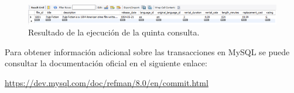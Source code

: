\documentclass{db-practice}
\begin{document}
\begin{figure}[ht]
    \centering
    \includegraphics[width=0.9\columnwidth]{figs/5consulta.png}
    \caption{Resultado de la ejecución de la quinta consulta.}\label{fig:5consulta}
\end{figure}

Para obtener información adicional sobre las transacciones en MySQL se puede consultar la documentación oficial en el siguiente enlace:

\url{https://dev.mysql.com/doc/refman/8.0/en/commit.html}
\end{document}

